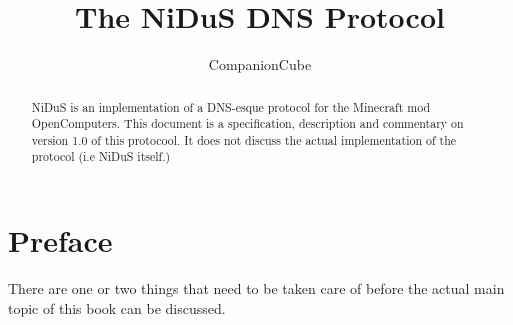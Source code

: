 \documentclass[]{report}
\title{The NiDuS DNS Protocol}
\author{CompanionCube}
\begin{document}
\maketitle

\begin{abstract}
NiDuS is an implementation of a DNS-esque protocol for the Minecraft mod OpenComputers. This document is a specification, description and commentary on version 1.0 of this protocool. It does not discuss the actual implementation of the protocol (i.e NiDuS itself.)
\end{abstract}

\chapter{Preface}
There are one or two things that need to be taken care of before the actual main topic of this book can be discussed.
\end{document}
